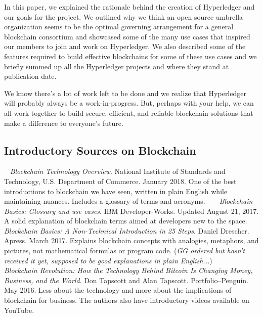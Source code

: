 In this paper, we explained the rationale behind the creation of Hyperledger and our goals for the project. We outlined why we think an open source umbrella organization seems to be the optimal governing arrangement for a general blockchain consortium and showcased some of the many use cases that inspired our members to join and work on Hyperledger. We also described some of the features required to build effective blockchains for some of these use cases and we briefly summed up all the Hyperledger projects and where they stand at publication date. 

We know there's a lot of work left to be done and we realize that Hyperledger will probably always be a work-in-progress. 
But, perhaps with your help, we can all work together to build secure, efficient, and reliable blockchain solutions that make a difference to everyone's future.

\subsection{Introductory Sources on Blockchain}
~\newline
\emph{Blockchain Technology Overview}. National Institute of Standards and Technology, U.S. Department of Commerce. January 2018. One of the best introductions to blockchain we have seen, written in plain English while maintaining nuances. Includes a glossary of terms and acronyms. 
~\newline
~\newline
\emph{Blockchain Basics: Glossary and use cases}. IBM Developer-Works. Updated August 21, 2017. A solid explanation of blockchain terms aimed at developers new to the space. 
~\newline
~\newline
\emph{Blockchain Basics: A Non-Technical Introduction in 25 Steps}. Daniel Drescher. Apress. March 2017. Explains blockchain concepts with analogies, metaphors, and pictures, not mathematical formulas or program code. (\emph{GG ordered but hasn't received it yet, supposed to be good explanations in plain English...})
~\newline
~\newline
\emph{Blockchain Revolution: How the Technology Behind Bitcoin Is Changing Money, Business, and the World}. Don Tapscott and Alan Tapscott. Portfolio--Penguin. May 2016. Less about the technology and more about the implications of blockchain for business. The authors also have introductory videos available on YouTube. 

